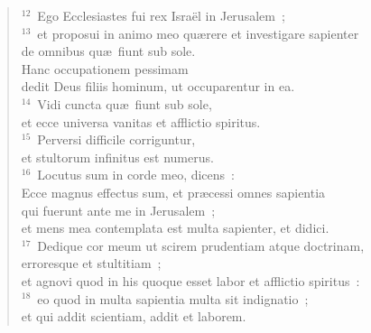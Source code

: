 \begin{verse}${}^{12}$~Ego Ecclesiastes fui rex Isra\"el in Jerusalem~;\\
${}^{13}$~et proposui in animo meo qu\ae rere et investigare sapienter\\ de omnibus qu\ae\ fiunt sub sole.\\ Hanc occupationem pessimam\\ dedit Deus filiis hominum, ut occuparentur in ea.\\
${}^{14}$~Vidi cuncta qu\ae\ fiunt sub sole,\\ et ecce universa vanitas et afflictio spiritus.\\
${}^{15}$~Perversi difficile corriguntur,\\ et stultorum infinitus est numerus.\\
${}^{16}$~Locutus sum in corde meo, dicens~:\\ Ecce magnus effectus sum, et pr\ae cessi omnes sapientia\\ qui fuerunt ante me in Jerusalem~;\\ et mens mea contemplata est multa sapienter, et didici.\\
${}^{17}$~Dedique cor meum ut scirem prudentiam atque doctrinam,\\ erroresque et stultitiam~;\\ et agnovi quod in his quoque esset labor et afflictio spiritus~:\\
${}^{18}$~eo quod in multa sapientia multa sit indignatio~;\\ et qui addit scientiam, addit et laborem.\end{verse}


